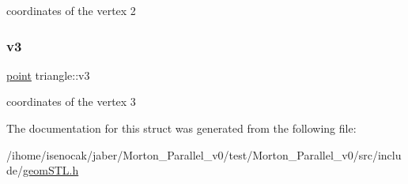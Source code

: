 coordinates of the vertex 2 \mbox{\label{structtriangle_ae5cd151c51a4de27c02f1a742f5171e7}} 
\subsubsection{\texorpdfstring{v3}{v3}}
{\footnotesize\ttfamily \mbox{\hyperlink{structpoint}{point}} triangle\+::v3}

coordinates of the vertex 3 

The documentation for this struct was generated from the following file\+:\begin{DoxyCompactItemize}
\item 
/ihome/isenocak/jaber/\+Morton\+\_\+\+Parallel\+\_\+v0/test/\+Morton\+\_\+\+Parallel\+\_\+v0/src/include/\mbox{\hyperlink{geomSTL_8h}{geom\+S\+T\+L.\+h}}\end{DoxyCompactItemize}
